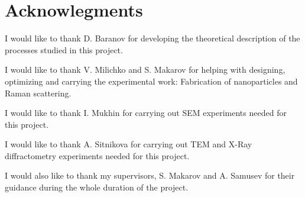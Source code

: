 \section*{Acknowlegments}

        I would like to thank D. Baranov for developing the theoretical description of the processes studied in this project.

        I would like to thank V. Milichko and S. Makarov for helping with designing, optimizing and carrying the experimental work:
    Fabrication of nanoparticles and Raman scattering.

        I would like to thank I. Mukhin for carrying out SEM experiments needed for this project.

        I would like to thank A. Sitnikova for carrying out TEM and X-Ray diffractometry experiments needed for this project.

        I would also like to thank my supervisors, S. Makarov and A. Samusev for their guidance during the whole duration of the project.


\clearpage
